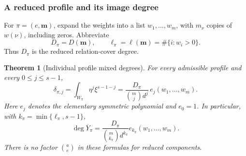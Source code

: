 \documentclass[10pt,fleqn]{article}
\numberwithin{equation}{section}
\newtheorem{theorem}{Theorem}[section]
\begin{document}
\subsubsection{A reduced profile and its image degree}
\label{r19:sec:individual-degrees}
For $\pi=(e,\boldsymbol m)$, expand the weights into a list
$w_1,\ldots,w_m$, with $m_\nu$ copies of $w(\nu)$, including zeros.
Abbreviate
\begin{equation}\label{v6:degree:data}
 D_\pi=D(\boldsymbol m),\qquad
 \ell_\pi=\ell(\boldsymbol m)=\#\{i:w_i>0\}.
\end{equation}
Thus $D_\pi$ is the reduced relation-cover degree.

\begin{theorem}[Individual profile mixed degrees]
\label{v6:degree:formula}
For every admissible profile and every $0\le j\le s-1$,
\begin{equation}\label{v6:degree:explicit}
 \boxed{\displaystyle
 \delta_{\pi,j}=\int_{W_\pi}\eta^j\xi^{s-1-j}
  =\frac{D_\pi}{\binom mj d^j}\,
    e_j(w_1,\ldots,w_m).}
\end{equation}
Here $e_j$ denotes the elementary symmetric polynomial and $e_0=1$.
In particular, with $k_\pi=\min\{\ell_\pi,s-1\}$,
\begin{equation}\label{v6:degree:image-degree}
 \deg\overline Y_\pi
  =\frac{D_\pi}{\binom m{k_\pi}d^{k_\pi}}
      e_{k_\pi}(w_1,\ldots,w_m).
\end{equation}
There is no factor $\binom ae$ in these formulas for reduced
components.
\end{theorem}
\end{document}
